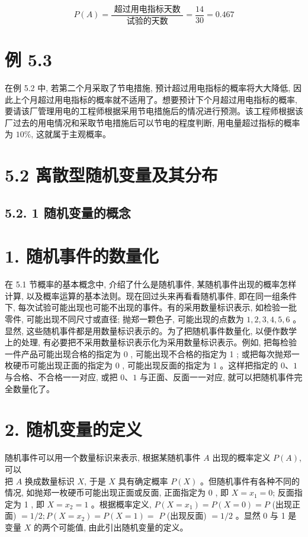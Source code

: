 \documentclass[10pt]{article}
\begin{document}
\begin{CJK*}{UTF8}{bsmi}
$$
P(A)=\frac{\text { 超过用电指标天数 }}{\text { 试验的天数 }}=\frac{14}{30}=0.467
$$

\section*{例 5.3}
在例 5.2 中, 若第二个月采取了节电措施, 预计超过用电指标的概率将大大降低, 因此上个月超过用电指标的概率就不适用了。想要预计下个月超过用电指标的概率, 要请该厂管理用电的工程师根据采用节电措施后的情况进行预测。该工程师根据该厂过去的用电情况和采取节电措施后可以节电的程度判断, 用电量超过指标的概率为 $10 \%$, 这就属于主观概率。

\section*{5.2 离散型随机变量及其分布}
\subsection*{5.2. 1 随机变量的概念}
\section*{1. 随机事件的数量化}
在 5.1 节概率的基本概念中, 介绍了什么是随机事件, 某随机事件出现的概率怎样计算, 以及概率运算的基本法则。现在回过头来再看看随机事件, 即在同一组条件下, 每次试验可能出现也可能不出现的事件。有的采用数量标识表示, 如检验一批零件, 可能出现不同尺寸或直径; 抛郑一颗色子, 可能出现的点数为 $1,2,3,4,5,6$ 。显然, 这些随机事件都是用数量标识表示的。为了把随机事件数量化, 以便作数学上的处理, 有必要把不采用数量标识表示化为采用数量标识表示。例如, 把每检验一件产品可能出现合格的指定为 0 , 可能出现不合格的指定为 1 ; 或把每次抛郑一枚硬币可能出现正面的指定为 0 , 可能出现反面的指定为 1 。这样把指定的 $0 、 1$ 与合格、不合格一一对应, 或把 $0 、 1$ 与正面、反面一一对应, 就可以把随机事件完全数量化了。

\section*{2. 随机变量的定义}
随机事件可以用一个数量标识来表示, 根据某随机事件 $A$ 出现的概率定义 $P(A)$, 可以\\
把 $A$ 换成数量标识 $X$, 于是 $X$ 具有确定概率 $P(X)$ 。但随机事件有各种不同的情况, 如抛郑一枚硬币可能出现正面或反面, 正面指定为 0 , 即 $X=x_{1}=0$; 反面指定为 1 , 即 $X=x_{2}=1$ 。根据概率定义, $P\left(X=x_{1}\right)=P(X=0)=P$ (出现正面) $=1 / 2 ; P\left(X=x_{2}\right)=P(X=1)=$ $P$ (出现反面) $=1 / 2$ 。显然 0 与 1 是变量 $X$ 的两个可能值, 由此引出随机变量的定义。


\end{CJK*}
\end{document}
